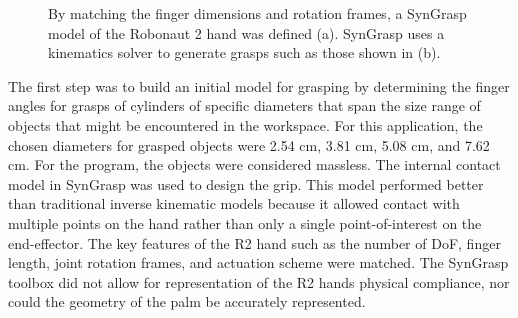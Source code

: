 \documentclass[runningheads,a4paper]{llncs}
\begin{document}
\begin{figure}[t]%
\centering
\null\hfill
	\hfill
	\hfill\null

\caption{By matching the finger dimensions and rotation frames, a SynGrasp model of the Robonaut 2 hand was defined (a). SynGrasp uses a kinematics solver to generate grasps such as those shown in (b). }%
\label{fig:models}%
\end{figure} 

The first step was to build an initial model for grasping by determining the finger angles for grasps of cylinders of specific diameters that span the size range of objects that might be encountered in the workspace. For this application, the chosen diameters for grasped objects were 2.54 cm, 3.81 cm, 5.08 cm, and 7.62 cm. For the program, the objects were considered massless. The internal contact model in SynGrasp was used to design the grip. This model performed better than traditional inverse kinematic models because it allowed contact with multiple points on the hand rather than only a single point-of-interest on the end-effector. The key features of the R2 hand such as the number of  DoF, finger length, joint rotation frames, and actuation scheme were matched. The SynGrasp toolbox did not allow for representation of the R2 hands physical compliance, nor could the geometry of the palm be accurately represented. 
\end{document}
